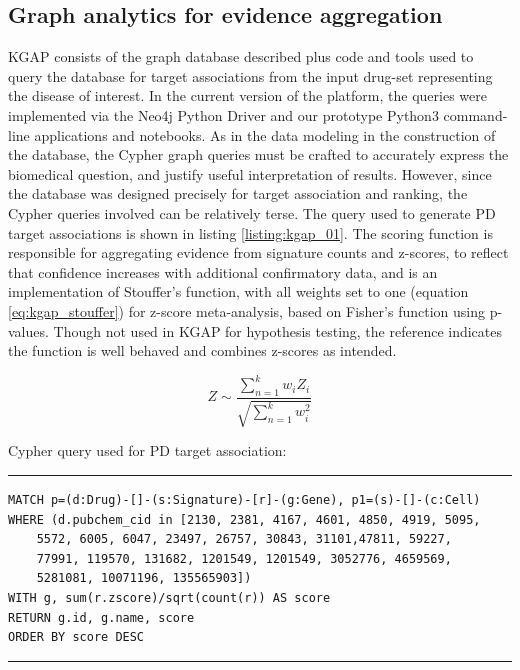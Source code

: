 \subsection{Graph analytics for evidence aggregation}

KGAP consists of the graph database described plus code and tools used to query the database for target associations from the input drug-set representing the disease of interest. In the current version of the platform, the queries were implemented via the Neo4j Python Driver\cite{Neo4j_Inc_undated-ly} and our prototype Python3 command-line applications and notebooks. As in the data modeling in the construction of the database, the Cypher graph queries must be crafted to accurately express the biomedical question, and justify useful interpretation of results. However, since the database was designed precisely for target association and ranking, the Cypher queries involved can be relatively terse. The query used to generate PD target associations is shown in listing \ref{listing:kgap_01}. The scoring function is responsible for aggregating evidence from signature counts and z-scores, to reflect that confidence increases with additional confirmatory data, and is an implementation of Stouffer's function, with all weights set to one (equation \ref{eq:kgap_stouffer}) for z-score meta-analysis, based on Fisher's function using p-values\cite{Rosenthal1978-in}. Though not used in KGAP for hypothesis testing, the reference indicates the function is well behaved and combines z-scores as intended. 

\begin{equation}
Z \sim \frac{\sum_{n=1}^{k}w_iZ_i}{\sqrt{\sum_{n=1}^{k}w_i^2}}
\label{eq:kgap_stouffer}
\end{equation}

Cypher query used for PD target association:\\
\rule[0.5ex]{\linewidth}{1pt}
\begin{singlespace}
\begin{lstlisting}[caption=KGAP Cypher query,label=listing:kgap_01]
MATCH p=(d:Drug)-[]-(s:Signature)-[r]-(g:Gene), p1=(s)-[]-(c:Cell)
WHERE (d.pubchem_cid in [2130, 2381, 4167, 4601, 4850, 4919, 5095, 
    5572, 6005, 6047, 23497, 26757, 30843, 31101,47811, 59227, 
    77991, 119570, 131682, 1201549, 1201549, 3052776, 4659569, 
    5281081, 10071196, 135565903])
WITH g, sum(r.zscore)/sqrt(count(r)) AS score
RETURN g.id, g.name, score
ORDER BY score DESC
\end{lstlisting}
\rule[0.5ex]{\linewidth}{1pt}
\end{singlespace}

